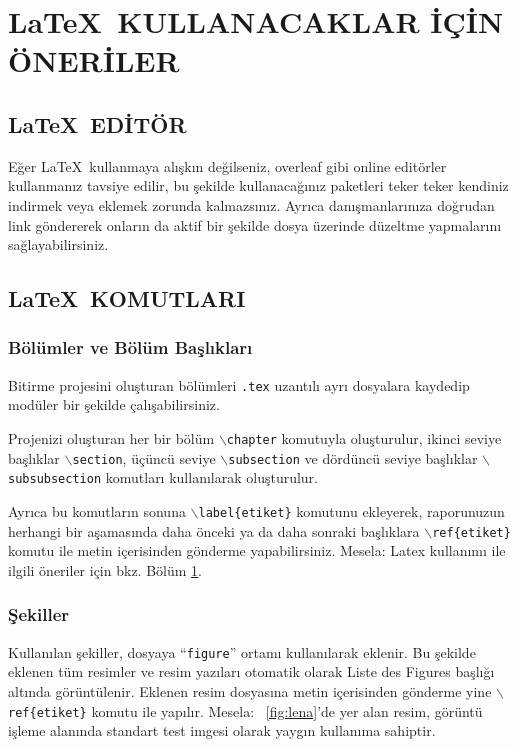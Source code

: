 \chapter{\LaTeX \, KULLANACAKLAR İÇİN ÖNERİLER}\label{latexchapter}
\thispagestyle{empty} %

\section{\LaTeX \, EDİTÖR}
Eğer \LaTeX \, kullanmaya alışkın değilseniz, overleaf gibi online editörler kullanmanız tavsiye edilir, bu şekilde kullanacağınız paketleri teker teker kendiniz indirmek veya eklemek zorunda kalmazsınız. Ayrıca danışmanlarınıza doğrudan link göndererek onların da aktif bir şekilde dosya üzerinde düzeltme yapmalarını sağlayabilirsiniz. 

\section{\LaTeX \, KOMUTLARI}

\subsection{Bölümler ve Bölüm Başlıkları}
Bitirme projesini oluşturan bölümleri \texttt{.tex} uzantılı ayrı dosyalara kaydedip modüler bir şekilde çalışabilirsiniz. 

Projenizi oluşturan her bir bölüm $\backslash$\texttt{chapter} komutuyla oluşturulur, ikinci seviye başlıklar $\backslash$\texttt{section}, üçüncü seviye $\backslash$\texttt{subsection} ve dördüncü seviye başlıklar $\backslash$\texttt{subsubsection} komutları kullanılarak oluşturulur.

Ayrıca bu komutların sonuna $\backslash$\texttt{label\{etiket\}} komutunu ekleyerek, raporunuzun herhangi bir aşamasında daha önceki ya da daha sonraki başlıklara $\backslash$\texttt{ref\{etiket\}} komutu ile metin içerisinden gönderme yapabilirsiniz. Mesela: 
Latex kullanımı ile ilgili öneriler için bkz. Bölüm \ref{latexchapter}.

\subsection{Şekiller}
Kullanılan şekiller, dosyaya ``\texttt{figure}'' ortamı kullanılarak eklenir. Bu şekilde eklenen tüm resimler ve resim yazıları otomatik olarak Liste des Figures başlığı altında görüntülenir. Eklenen resim dosyasına metin içerisinden gönderme yine $\backslash$\texttt{ref\{etiket\}} komutu ile yapılır. Mesela:
\figurename~\ref{fig:lena}'de yer alan resim, görüntü işleme alanında standart test imgesi olarak yaygın kullanıma sahiptir.

